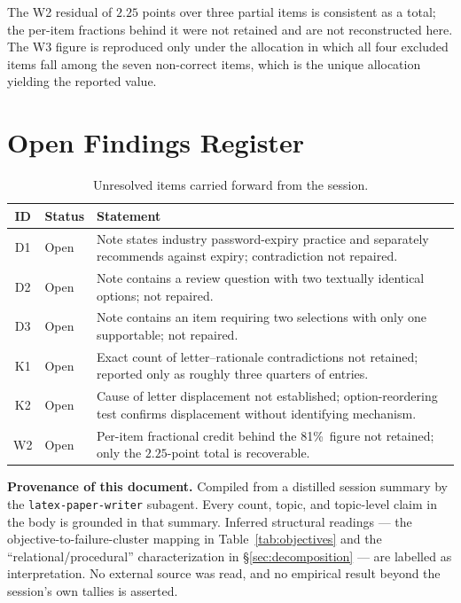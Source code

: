 \documentclass[11pt]{article}
\newcommand{\pct}{\%}
\begin{document}
The W2 residual of $2.25$ points over three partial items is consistent as a
total; the per-item fractions behind it were not retained and are not
reconstructed here. The W3 figure is reproduced only under the allocation in
which all four excluded items fall among the seven non-correct items, which
is the unique allocation yielding the reported value.

\section{Open Findings Register}
\label{sec:register}

\begin{table}[htbp]
\centering
\caption{Unresolved items carried forward from the session.}
\label{tab:open}
\begin{tabular}{@{}clp{}@{}}
\toprule
ID & Status & Statement \\
\midrule
D1 & Open & Note states industry password-expiry practice and separately
      recommends against expiry; contradiction not repaired. \\
D2 & Open & Note contains a review question with two textually identical
      options; not repaired. \\
D3 & Open & Note contains an item requiring two selections with only one
      supportable; not repaired. \\
K1 & Open & Exact count of letter--rationale contradictions not retained;
      reported only as roughly three quarters of entries. \\
K2 & Open & Cause of letter displacement not established; option-reordering
      test confirms displacement without identifying mechanism. \\
W2 & Open & Per-item fractional credit behind the 81\pct\ figure not
      retained; only the $2.25$-point total is recoverable. \\
\bottomrule
\end{tabular}
\end{table}

\noindent\begin{minipage}{\textwidth}
\small\textbf{Provenance of this document.} Compiled from a distilled session
summary by the \texttt{latex-paper-writer} subagent. Every count, topic, and
topic-level claim in the body is grounded in that summary. Inferred
structural readings --- the objective-to-failure-cluster mapping in
Table~\ref{tab:objectives} and the ``relational/procedural'' characterization
in \S\ref{sec:decomposition} --- are labelled as interpretation. No external
source was read, and no empirical result beyond the session's own tallies is
asserted.
\end{minipage}
\end{document}

